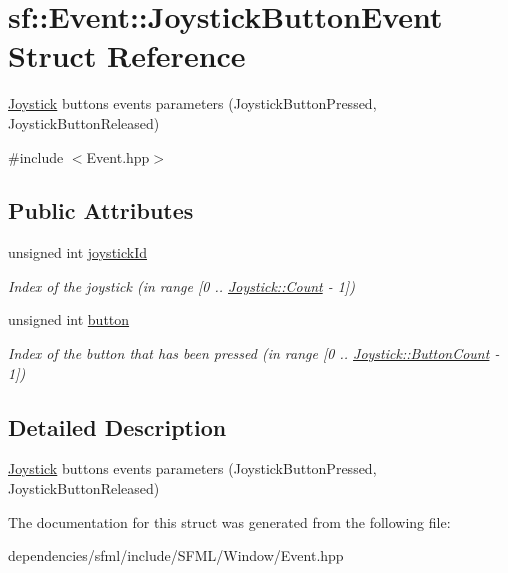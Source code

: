 \hypertarget{structsf_1_1_event_1_1_joystick_button_event}{}\section{sf\+:\+:Event\+:\+:Joystick\+Button\+Event Struct Reference}
\label{structsf_1_1_event_1_1_joystick_button_event}


\hyperlink{classsf_1_1_joystick}{Joystick} buttons events parameters (Joystick\+Button\+Pressed, Joystick\+Button\+Released)  




{\ttfamily \#include $<$Event.\+hpp$>$}

\subsection*{Public Attributes}
\begin{DoxyCompactItemize}
\item 
\mbox{\label{structsf_1_1_event_1_1_joystick_button_event_a2f80ecdb964a5ae0fc30726a404c41ec}} 
unsigned int \hyperlink{structsf_1_1_event_1_1_joystick_button_event_a2f80ecdb964a5ae0fc30726a404c41ec}{joystick\+Id}
\begin{DoxyCompactList}\small\item\em Index of the joystick (in range \mbox{[}0 .. \hyperlink{classsf_1_1_joystick_afeddb38b35ca6be2310127d75c2d7e7aa6e0a2a95bc1da277610c04d80f52715e}{Joystick\+::\+Count} -\/ 1\mbox{]}) \end{DoxyCompactList}\item 
\mbox{\label{structsf_1_1_event_1_1_joystick_button_event_a6412e698a2f7904c5aa875a0d1b34da4}} 
unsigned int \hyperlink{structsf_1_1_event_1_1_joystick_button_event_a6412e698a2f7904c5aa875a0d1b34da4}{button}
\begin{DoxyCompactList}\small\item\em Index of the button that has been pressed (in range \mbox{[}0 .. \hyperlink{classsf_1_1_joystick_afeddb38b35ca6be2310127d75c2d7e7aa2f1b8a0a59f2c12a4775c0e1e69e1816}{Joystick\+::\+Button\+Count} -\/ 1\mbox{]}) \end{DoxyCompactList}\end{DoxyCompactItemize}


\subsection{Detailed Description}
\hyperlink{classsf_1_1_joystick}{Joystick} buttons events parameters (Joystick\+Button\+Pressed, Joystick\+Button\+Released) 

The documentation for this struct was generated from the following file\+:\begin{DoxyCompactItemize}
\item 
dependencies/sfml/include/\+S\+F\+M\+L/\+Window/Event.\+hpp\end{DoxyCompactItemize}
